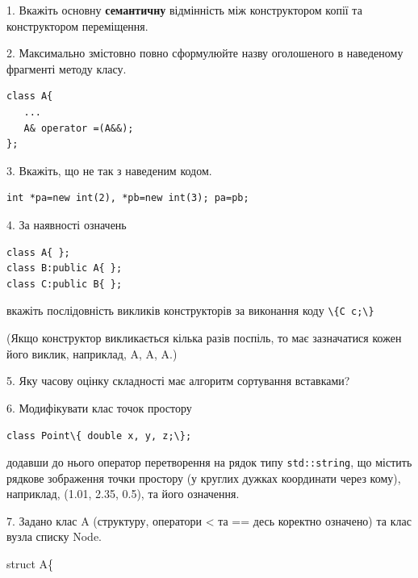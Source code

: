 \documentclass[12pt, ukrainian]{article}
\def\code#1{\Verb!#1!}
\begin{document}
{%
1. Вкажіть основну \textbf{семантичну} відмінність між конструктором копії та конструктором переміщення.%
\par
\vspace{2mm}
2. Максимально змістовно повно сформулюйте назву оголошеного в наведеному фрагменті методу класу.
\vspace{-3mm}
\begin{verbatim}class A{
   ...
   A& operator =(A&&);
};\end{verbatim}
\vspace{-3mm}
\par
\vspace{2mm}
3. Вкажіть, що не так з наведеним кодом.
\vspace{-3mm}
\begin{verbatim}int *pa=new int(2), *pb=new int(3); pa=pb;\end{verbatim}
\vspace{-3mm}
\par
\vspace{2mm}
4. За наявності означень
\vspace{-3mm}
\begin{verbatim}
class A{ };
class B:public A{ };
class C:public B{ };\end{verbatim}
\vspace{-3mm}
вкажіть послідовність викликів конструкторів за виконання коду \code{\{C c;\}} 

(Якщо конструктор викликається кілька разів поспіль, то має зазначатися кожен його виклик, наприклад, A, A, A.)

\vspace{2mm}
5. Яку часову оцінку складності має алгоритм сортування вставками?
\par
\vspace{2mm}
6. Модифікувати клас точок простору 

\qquad\code{class Point\{ double x, y, z;\};}


додавши до нього оператор перетворення на рядок типу \code{std::string}, що містить рядкове зображення точки простору (у круглих дужках координати через кому), наприклад, (1.01, 2.35, 0.5), та його означення.%
\par
\vspace{2mm}
7. 
Задано клас A (структуру, оператори < та == десь коректно означено) та клас вузла списку Node.

struct A\{

}
\end{document}
